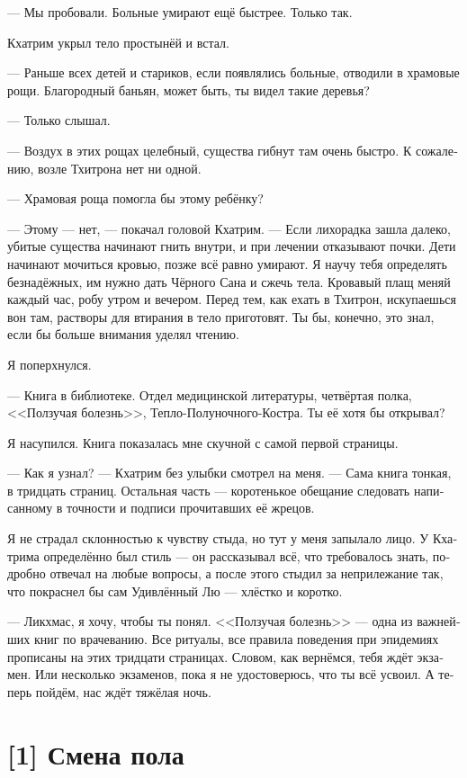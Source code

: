 \documentclass[a4paper,12pt,fleqn]{book}\usepackage{cooltooltips}\usepackage{polyglossia}\setdefaultlanguage[babelshorthands=true]{russian}\setotherlanguage{english}\defaultfontfeatures{Ligatures=TeX,Mapping=tex-text} \usepackage{xcolor}\definecolor{lightgray}{HTML}{bbbbbb}\color{lightgray}\newcommand{\ml}[3]{\textenglish{\textcolor{black}{#3}}}
\begin{document}
{--- Мы пробовали.
Больные умирают ещё быстрее.
Только так.

Кхатрим укрыл тело простынёй и встал.

--- Раньше всех детей и стариков, если появлялись больные, отводили в храмовые рощи.
Благородный баньян, может быть, ты видел такие деревья?

--- Только слышал.

--- Воздух в этих рощах целебный, существа гибнут там очень быстро.
К сожалению, возле Тхитрона нет ни одной.

--- Храмовая роща помогла бы этому ребёнку?

--- Этому --- нет, --- покачал головой Кхатрим.
--- Если лихорадка зашла далеко, убитые существа начинают гнить внутри, и при лечении отказывают почки.
Дети начинают мочиться кровью, позже всё равно умирают.
Я научу тебя определять безнадёжных, им нужно дать Чёрного Сана и сжечь тела.
Кровавый плащ меняй каждый час, робу утром и вечером.
Перед тем, как ехать в Тхитрон, искупаешься вон там, растворы для втирания в тело приготовят.
Ты бы, конечно, это знал, если бы больше внимания уделял чтению.

Я поперхнулся.

--- Книга в библиотеке.
Отдел медицинской литературы, четвёртая полка, <<Ползучая болезнь>>, Тепло-Полуночного-Костра.
Ты её хотя бы открывал?

Я насупился.
Книга показалась мне скучной с самой первой страницы.

--- Как я узнал? --- Кхатрим без улыбки смотрел на меня.
--- Сама книга тонкая, в тридцать страниц.
Остальная часть --- коротенькое обещание следовать написанному в точности и подписи прочитавших её жрецов.

Я не страдал склонностью к чувству стыда, но тут у меня запылало лицо.
У Кхатрима определённо был стиль --- он рассказывал всё, что требовалось знать, подробно отвечал на любые вопросы, а после этого стыдил за неприлежание так, что покраснел бы сам Удивлённый Лю --- хлёстко и коротко.

--- Ликхмас, я хочу, чтобы ты понял.
<<Ползучая болезнь>> --- одна из важнейших книг по врачеванию.
Все ритуалы, все правила поведения при эпидемиях прописаны на этих тридцати страницах.
Словом, как вернёмся, тебя ждёт экзамен.
Или несколько экзаменов, пока я не удостоверюсь, что ты всё усвоил.
А теперь пойдём, нас ждёт тяжёлая ночь.

\section{[1] Смена пола}

}
\end{document}
